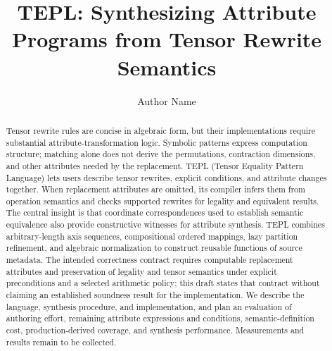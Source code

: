 \documentclass[acmsmall,review,screen,nonacm]{acmart}
\title[TEPL]{TEPL: Synthesizing Attribute Programs from Tensor Rewrite Semantics}
\author{Author Name}
\affiliation{\institution{Institution}\city{City}\country{Country}}
\begin{document}
\raggedbottom
\begin{abstract}
Tensor rewrite rules are concise in algebraic form, but their implementations
require substantial attribute-transformation logic. Symbolic patterns express
computation structure; matching alone does not derive the permutations,
contraction dimensions, and other attributes needed by the replacement.
TEPL (Tensor Equality Pattern Language) lets users describe tensor rewrites,
explicit conditions, and attribute changes together. When replacement
attributes are omitted, its compiler infers them from operation semantics and
checks supported rewrites for legality and equivalent results. The central
insight is that coordinate correspondences used to establish semantic
equivalence also provide constructive witnesses for attribute synthesis.
TEPL combines arbitrary-length axis sequences, compositional ordered mappings,
lazy partition refinement, and algebraic normalization to construct reusable
functions of source metadata. The intended correctness contract requires
computable replacement attributes and preservation of legality and tensor
semantics under explicit preconditions and a selected arithmetic policy;
this draft states that contract without claiming an established soundness
result for the implementation. We describe the language, synthesis procedure,
and implementation, and plan an evaluation of authoring effort, remaining
attribute expressions and conditions, semantic-definition cost,
production-derived coverage, and synthesis performance. Measurements and
results remain to be collected.
\end{abstract}
\maketitle

\FloatBarrier

\FloatBarrier

\FloatBarrier

\FloatBarrier

\FloatBarrier

\FloatBarrier

\FloatBarrier

\FloatBarrier

\FloatBarrier

\FloatBarrier



\appendix
\FloatBarrier

\end{document}
